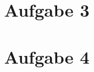 \documentclass[a4paper]{scrartcl}
\begin{document}
\section*{Aufgabe 3}

\section*{Aufgabe 4}


\end{document}

